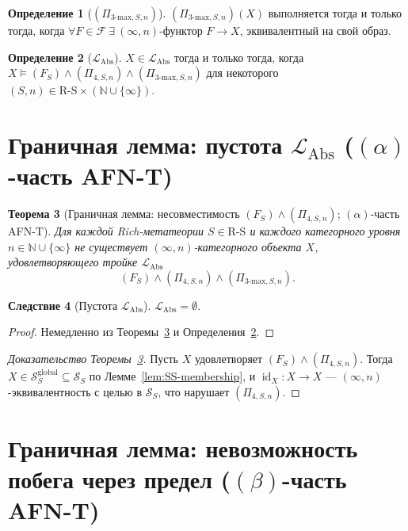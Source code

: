 \documentclass[11pt]{article}
\theoremstyle{plain}
\newtheorem{theorem}{Теорема}[section]
\newtheorem{corollary}[theorem]{Следствие}
\theoremstyle{definition}
\newtheorem{definition}[theorem]{Определение}
\newcommand{\RS}{\mathrm{R\text{-}S}}
\newcommand{\cS}{\mathcal{S}}
\newcommand{\cF}{\mathcal{F}}
\newcommand{\LAbs}{\mathcal{L}_{\mathrm{Abs}}}
\DeclareMathOperator{\id}{id}
\begin{document}
\begin{definition}[$(\Pi_{3\text{-max}, S, n})$]\label{def:pi3max}
$(\Pi_{3\text{-max}, S, n})(X)$ выполняется тогда и только тогда, когда $\forall F \in \cF\ \exists\ (\infty, n)$-функтор $F \to X$, эквивалентный на свой образ.
\end{definition}

\begin{definition}[$\LAbs$]\label{def:level6}
$X \in \LAbs$ тогда и только тогда, когда $X \models (F_S) \wedge (\Pi_{4, S, n}) \wedge (\Pi_{3\text{-max}, S, n})$ для некоторого $(S, n) \in \RS \times (\mathbb{N} \cup \{\infty\})$.
\end{definition}

\section{\texorpdfstring{Граничная лемма: пустота $\LAbs$ ($(\alpha)$-часть AFN-T)}{Граничная лемма: пустота L\_Abs ((alpha)-часть AFN-T)}}\label{sec:afnt-alpha}

\begin{theorem}[Граничная лемма: несовместимость $(F_S) \wedge (\Pi_{4, S, n})$; $(\alpha)$-часть AFN-T]\label{thm:afnt-alpha}
Для каждой Rich-метатеории $S \in \RS$ и каждого категорного уровня $n \in \mathbb{N} \cup \{\infty\}$ не существует $(\infty, n)$-категорного объекта $X$, удовлетворяющего тройке $\LAbs$
\[
(F_S) \wedge (\Pi_{4, S, n}) \wedge (\Pi_{3\text{-max}, S, n}).
\]
\end{theorem}

\begin{corollary}[Пустота $\LAbs$]\label{cor:level6-empty-alpha}
$\LAbs = \emptyset$.
\end{corollary}

\begin{proof}
Немедленно из Теоремы~\ref{thm:afnt-alpha} и Определения~\ref{def:level6}.
\end{proof}

\begin{proof}[Доказательство Теоремы~\ref{thm:afnt-alpha}]
Пусть $X$ удовлетворяет $(F_S) \wedge (\Pi_{4, S, n})$. Тогда $X \in \cS_S^{\mathrm{global}} \subseteq \cS_S$ по Лемме~\ref{lem:SS-membership}, и $\id_X : X \to X$ — $(\infty, n)$-эквивалентность с целью в $\cS_S$, что нарушает $(\Pi_{4, S, n})$.
\end{proof}

\section{\texorpdfstring{Граничная лемма: невозможность побега через предел ($(\beta)$-часть AFN-T)}{Граничная лемма: невозможность побега через предел ((beta)-часть AFN-T)}}\label{sec:afnt-beta}
\end{document}
